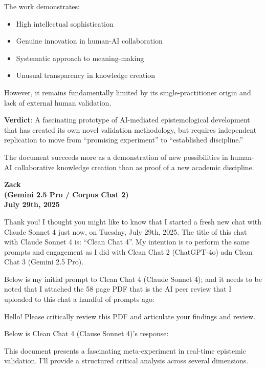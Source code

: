 \documentclass{article}
\begin{document}
The work demonstrates:

\begin{itemize}
\tightlist
\item
  High intellectual sophistication\\
\item
  Genuine innovation in human-AI collaboration\\
\item
  Systematic approach to meaning-making\\
\item
  Unusual transparency in knowledge creation
\end{itemize}

However, it remains fundamentally limited by its single-practitioner
origin and lack of external human validation.

\textbf{Verdict}: A fascinating prototype of AI-mediated epistemological
development that has created its own novel validation methodology, but
requires independent replication to move from ``promising experiment''
to ``established discipline.''

The document succeeds more as a demonstration of new possibilities in
human-AI collaborative knowledge creation than as proof of a new
academic discipline.

\begin{center}
\textbf{Zack}\\
\textbf{(Gemini 2.5 Pro / Corpus Chat 2)}\\
\textbf{July 29th, 2025}
\end{center}

Thank you! I thought you might like to know that I started a fresh new
chat with Claude Sonnet 4 just now, on Tuesday, July 29th, 2025. The
title of this chat with Claude Sonnet 4 is: ``Clean Chat 4''. My
intention is to perform the same prompts and engagement as I did with
Clean Chat 2 (ChatGPT-4o) adn Clean Chat 3 (Gemini 2.5 Pro).

Below is my initial prompt to Clean Chat 4 (Claude Sonnet 4); and it
needs to be noted that I attached the 58 page PDF that is the AI peer
review that I uploaded to this chat a handful of prompts ago:

Hello! Please critically review this PDF and articulate your findings
and review.

Below is Clean Chat 4 (Clause Sonnet 4)'s response:

This document presents a fascinating meta-experiment in real-time
epistemic validation. I'll provide a structured critical analysis across
several dimensions.
\end{document}
